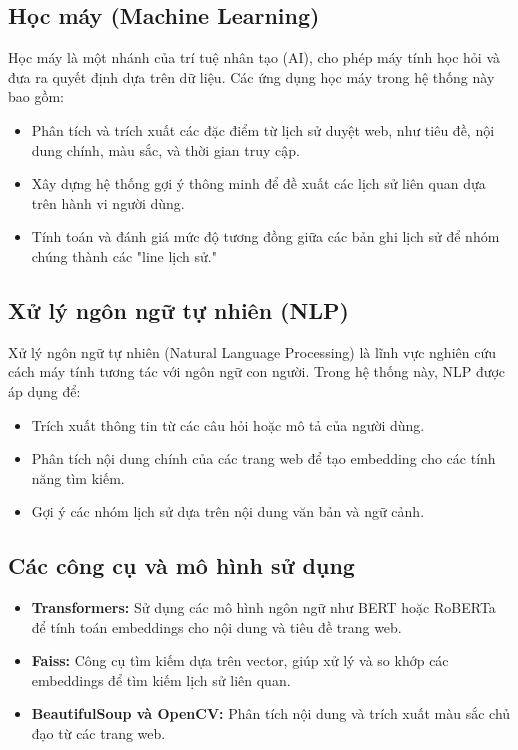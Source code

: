\subsection{Học máy (Machine Learning)}

Học máy là một nhánh của trí tuệ nhân tạo (AI), cho phép máy tính học hỏi và đưa ra quyết định dựa trên dữ liệu. Các ứng dụng học máy trong hệ thống này bao gồm:
\begin{itemize}
    \item Phân tích và trích xuất các đặc điểm từ lịch sử duyệt web, như tiêu đề, nội dung chính, màu sắc, và thời gian truy cập.
    \item Xây dựng hệ thống gợi ý thông minh để đề xuất các lịch sử liên quan dựa trên hành vi người dùng.
    \item Tính toán và đánh giá mức độ tương đồng giữa các bản ghi lịch sử để nhóm chúng thành các "line lịch sử."
\end{itemize}

\subsection{Xử lý ngôn ngữ tự nhiên (NLP)}

Xử lý ngôn ngữ tự nhiên (Natural Language Processing) là lĩnh vực nghiên cứu cách máy tính tương tác với ngôn ngữ con người. Trong hệ thống này, NLP được áp dụng để:
\begin{itemize}
    \item Trích xuất thông tin từ các câu hỏi hoặc mô tả của người dùng.
    \item Phân tích nội dung chính của các trang web để tạo embedding cho các tính năng tìm kiếm.
    \item Gợi ý các nhóm lịch sử dựa trên nội dung văn bản và ngữ cảnh.
\end{itemize}

\subsection{Các công cụ và mô hình sử dụng}

\begin{itemize}
    \item \textbf{Transformers:} Sử dụng các mô hình ngôn ngữ như BERT hoặc RoBERTa để tính toán embeddings cho nội dung và tiêu đề trang web.
    \item \textbf{Faiss:} Công cụ tìm kiếm dựa trên vector, giúp xử lý và so khớp các embeddings để tìm kiếm lịch sử liên quan.
    \item \textbf{BeautifulSoup và OpenCV:} Phân tích nội dung và trích xuất màu sắc chủ đạo từ các trang web.
\end{itemize}

